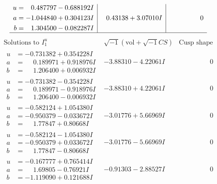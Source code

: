 \documentclass[1p]{elsarticle_modified}
\theoremstyle{definition}
\newcommand{\I}{\sqrt{-1}}
\begin{document}
$$\begin{array}{c|c|c}
\begin{aligned}
u &= \phantom{-}0.487797 - 0.688192 I \\
a &= -1.044840 + 0.304123 I \\
b &= \phantom{-}1.304500 - 0.082287 I\end{aligned}
 & \phantom{-}0.43138 + 3.07010 I & \phantom{-0.000000 } 0\\
 \hline 
 \end{array}$$\newpage$$\begin{array}{c|c|c}  
\text{Solutions to }I^u_{1}& \I (\text{vol} + \sqrt{-1}CS) & \text{Cusp shape}\\
 \hline 
\begin{aligned}
u &= -0.731382 + 0.354228 I \\
a &= \phantom{-}0.189971 + 0.918976 I \\
b &= \phantom{-}1.206400 + 0.006932 I\end{aligned}
 & -3.88310 - 4.22061 I & \phantom{-0.000000 } 0 \\ \hline\begin{aligned}
u &= -0.731382 - 0.354228 I \\
a &= \phantom{-}0.189971 - 0.918976 I \\
b &= \phantom{-}1.206400 - 0.006932 I\end{aligned}
 & -3.88310 + 4.22061 I & \phantom{-0.000000 } 0 \\ \hline\begin{aligned}
u &= -0.582124 + 1.054380 I \\
a &= -0.950379 - 0.033672 I \\
b &= \phantom{-}1.77847 + 0.80668 I\end{aligned}
 & -3.01776 + 5.66969 I & \phantom{-0.000000 } 0 \\ \hline\begin{aligned}
u &= -0.582124 - 1.054380 I \\
a &= -0.950379 + 0.033672 I \\
b &= \phantom{-}1.77847 - 0.80668 I\end{aligned}
 & -3.01776 - 5.66969 I & \phantom{-0.000000 } 0 \\ \hline\begin{aligned}
u &= -0.167777 + 0.765414 I \\
a &= \phantom{-}1.69805 - 0.76921 I \\
b &= -1.119090 + 0.121688 I\end{aligned}
 & -0.91303 - 2.88527 I & \phantom{-0.000000 } 0 \\ \hline\begin{aligned}

\end{aligned}
\end{array}$$
\end{document}
